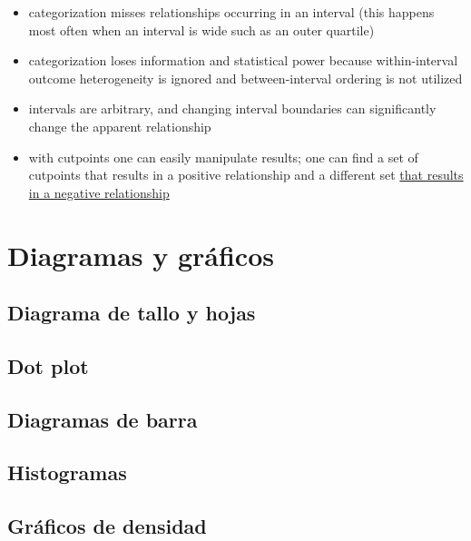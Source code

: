 \documentclass[
  letterpaper,
]{scrbook}
\providecommand{\tightlist}{%
  \setlength{\itemsep}{0pt}\setlength{\parskip}{0pt}}\usepackage{longtable,booktabs,array}
\begin{document}
\begin{itemize}
\tightlist
\item
  categorization misses relationships occurring in an interval (this
  happens most often when an interval is wide such as an outer quartile)
\item
  categorization loses information and statistical power because
  within-interval outcome heterogeneity is ignored and between-interval
  ordering is not utilized
\item
  intervals are arbitrary, and changing interval boundaries can
  significantly change the apparent relationship
\item
  with cutpoints one can easily manipulate results; one can find a set
  of cutpoints that results in a positive relationship and a different
  set
  \href{https://www.tandfonline.com/doi/abs/10.1080/09332480.2006.10722771}{that
  results in a negative relationship}
\end{itemize}

\hypertarget{diagramas-y-gruxe1ficos}{%
\section{Diagramas y gráficos}\label{diagramas-y-gruxe1ficos}}

\hypertarget{diagrama-de-tallo-y-hojas}{%
\subsection{Diagrama de tallo y hojas}\label{diagrama-de-tallo-y-hojas}}

\hypertarget{dot-plot}{%
\subsection{Dot plot}\label{dot-plot}}

\hypertarget{diagramas-de-barra}{%
\subsection{Diagramas de barra}\label{diagramas-de-barra}}

\hypertarget{histogramas}{%
\subsection{Histogramas}\label{histogramas}}

\hypertarget{gruxe1ficos-de-densidad}{%
\subsection{Gráficos de densidad}\label{gruxe1ficos-de-densidad}}
\end{document}
